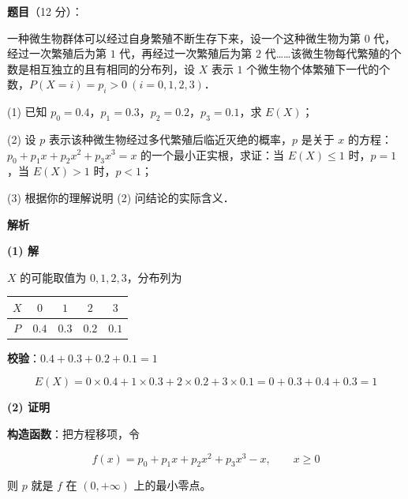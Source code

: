 \begin{answer}


\par\medskip

\end{answer}
\begin{answer}

\textbf{题目}（12 分）：

一种微生物群体可以经过自身繁殖不断生存下来，设一个这种微生物为第 $0$ 代，经过一次繁殖后为第 $1$ 代，再经过一次繁殖后为第 $2$ 代……该微生物每代繁殖的个数是相互独立的且有相同的分布列，设 $X$ 表示 $1$ 个微生物个体繁殖下一代的个数，$P(X=i)=p_i>0\ (i=0,1,2,3)$．

  (1) 已知 $p_0=0.4$，$p_1=0.3$，$p_2=0.2$，$p_3=0.1$，求 $E(X)$；

  (2) 设 $p$ 表示该种微生物经过多代繁殖后临近灭绝的概率，$p$ 是关于 $x$ 的方程：$p_0+p_1x+p_2x^{2}+p_3x^{3}=x$ 的一个最小正实根，求证：当 $E(X)\le1$ 时，$p=1$，当 $E(X)>1$ 时，$p<1$；

  (3) 根据你的理解说明 (2) 问结论的实际含义．

\textbf{解析}

\par\medskip

\textbf{(1) 解}

$X$ 的可能取值为 $0,1,2,3$，分布列为

\begin{center}
\begin{tabular}{ccccc}
\toprule
$X$ & $0$ & $1$ & $2$ & $3$ \\
\midrule
$P$ & $0.4$ & $0.3$ & $0.2$ & $0.1$ \\
\bottomrule
\end{tabular}
\end{center}

\textbf{校验}：$0.4+0.3+0.2+0.1=1$ 

\nopagebreak[4]
\[E(X)=0\times0.4+1\times0.3+2\times0.2+3\times0.1=0+0.3+0.4+0.3=1\]

\par\medskip

\textbf{(2) 证明}

\textbf{构造函数}：把方程移项，令

\nopagebreak[4]
\[f(x)=p_0+p_1x+p_2x^{2}+p_3x^{3}-x,\qquad x\ge0\]

则 $p$ 就是 $f$ 在 $(0,+\infty)$ 上的最小零点。


\end{answer}
